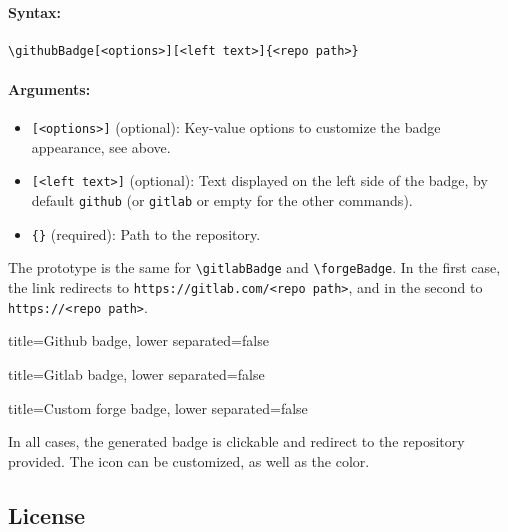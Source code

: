 \paragraph{Syntax:}
\begin{verbatim}
\githubBadge[<options>][<left text>]{<repo path>}
\end{verbatim}

\paragraph{Arguments:}
\begin{itemize}
    \item \texttt{[<options>]} (optional): Key-value options to customize the badge appearance, see above.
    \item \texttt{[<left text>]} (optional): Text displayed on the left side of the badge, by default \texttt{github} (or \texttt{gitlab} or empty for the other commands).
    \item \texttt{\{<repo path>\}} (required): Path to the repository.
\end{itemize}

The prototype is the same for \texttt{\textbackslash gitlabBadge} and \texttt{\textbackslash forgeBadge}.
In the first case, the link redirects to \texttt{https://gitlab.com/<repo path>},
and in the second to \texttt{https://<repo path>}.


\begin{tcblisting}{title={Github badge}, lower separated=false}
\end{tcblisting}

\begin{tcblisting}{title={Gitlab badge}, lower separated=false}
\end{tcblisting}

\begin{tcblisting}{title={Custom forge badge}, lower separated=false}
\end{tcblisting}

In all cases, the generated badge is clickable and redirect to the repository provided.
The icon can be customized, as well as the color.

\subsection{License}



